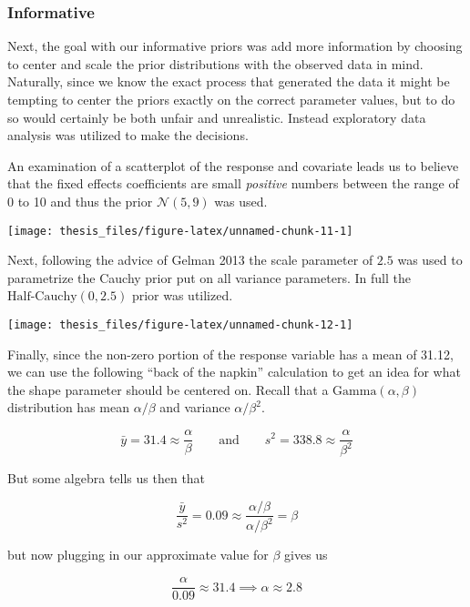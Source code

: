 \documentclass[12pt,twoside]{reedthesis}
\begin{document}
\hypertarget{informative}{%
\subsubsection{Informative}\label{informative}}

Next, the goal with our informative priors was add more information by choosing to center and scale the prior distributions with the observed data in mind. Naturally, since we know the exact process that generated the data it might be tempting to center the priors exactly on the correct parameter values, but to do so would certainly be both unfair and unrealistic. Instead exploratory data analysis was utilized to make the decisions.

An examination of a scatterplot of the response and covariate leads us to believe that the fixed effects coefficients are small \emph{positive} numbers between the range of 0 to 10 and thus the prior \(\mathcal{N}(5, 9)\) was used.
\begin{center}\texttt{[image: thesis\_files/figure-latex/unnamed-chunk-11-1]} \end{center}

Next, following the advice of Gelman 2013 the scale parameter of \(2.5\) was used to parametrize the Cauchy prior put on all variance parameters. In full the \(\text{Half-Cauchy}(0, 2.5)\) prior was utilized.
\begin{center}\texttt{[image: thesis\_files/figure-latex/unnamed-chunk-12-1]} \end{center}

Finally, since the non-zero portion of the response variable has a mean of 31.12, we can use the following ``back of the napkin'' calculation to get an idea for what the shape parameter should be centered on. Recall that a \(\text{Gamma}(\alpha, \beta)\) distribution has mean \(\alpha / \beta\) and variance \(\alpha / \beta^2\).

\[
\bar{y} = 31.4 \approx \frac{\alpha}{\beta}\qquad \text{and} \qquad s^2 = 338.8 \approx \frac{\alpha}{\beta^2}
\]

But some algebra tells us then that

\[
\frac{\bar{y}}{s^2} = 0.09 \approx \frac{\alpha / \beta}{\alpha / \beta^2} = \beta 
\]

but now plugging in our approximate value for \(\beta\) gives us

\[
\frac{\alpha}{0.09} \approx 31.4 \implies \alpha \approx 2.8
\]
\end{document}
